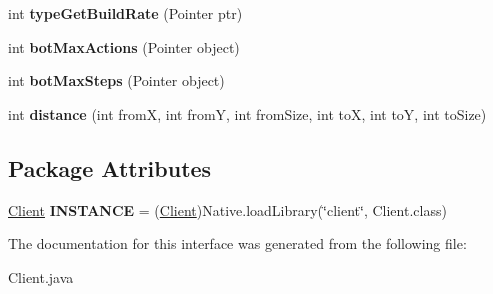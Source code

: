 \begin{DoxyCompactItemize}
\item 
\hypertarget{interfaceClient_a98d52a61c30e1bf7232ef43a916c106d}{
int {\bfseries typeGetBuildRate} (Pointer ptr)}
\label{interfaceClient_a98d52a61c30e1bf7232ef43a916c106d}

\item 
\hypertarget{interfaceClient_ad9a6ff3f17ff20964b738ee75fca73a1}{
int {\bfseries botMaxActions} (Pointer object)}
\label{interfaceClient_ad9a6ff3f17ff20964b738ee75fca73a1}

\item 
\hypertarget{interfaceClient_aa54b6063b7c49db8bfeb3fe674a33d19}{
int {\bfseries botMaxSteps} (Pointer object)}
\label{interfaceClient_aa54b6063b7c49db8bfeb3fe674a33d19}

\item 
\hypertarget{interfaceClient_a422fc288bd2857ccceb6dcf8ef21aae3}{
int {\bfseries distance} (int fromX, int fromY, int fromSize, int toX, int toY, int toSize)}
\label{interfaceClient_a422fc288bd2857ccceb6dcf8ef21aae3}

\end{DoxyCompactItemize}
\subsection*{Package Attributes}
\begin{DoxyCompactItemize}
\item 
\hypertarget{interfaceClient_a0ae9e0dc323a16f1240f314e379de21e}{
\hyperlink{interfaceClient}{Client} {\bfseries INSTANCE} = (\hyperlink{interfaceClient}{Client})Native.loadLibrary(\char`\"{}client\char`\"{}, Client.class)}
\label{interfaceClient_a0ae9e0dc323a16f1240f314e379de21e}

\end{DoxyCompactItemize}


The documentation for this interface was generated from the following file:\begin{DoxyCompactItemize}
\item 
Client.java\end{DoxyCompactItemize}
